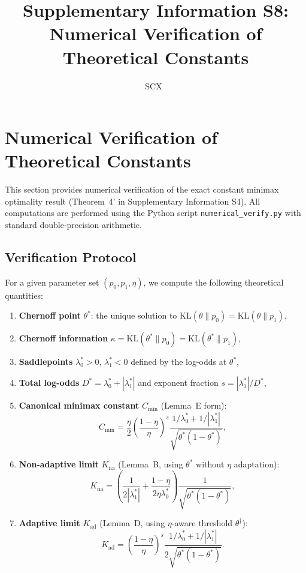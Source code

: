 \documentclass[article]{amsart}
\title{Supplementary Information S8: Numerical Verification of Theoretical Constants}
\author{SCX\ }
\theoremstyle{definition}
\begin{document}
\maketitle

\section{Numerical Verification of Theoretical Constants}

This section provides numerical verification of the exact constant minimax optimality result (Theorem~4' in Supplementary Information S4). All computations are performed using the Python script \texttt{numerical\_verify.py} with standard double-precision arithmetic.

\subsection{Verification Protocol}

For a given parameter set $(p_0, p_1, \eta)$, we compute the following theoretical quantities:

\begin{enumerate}
    \item \textbf{Chernoff point} $\theta^*$: the unique solution to $\mathrm{KL}(\theta\|p_0) = \mathrm{KL}(\theta\|p_1)$,
    \item \textbf{Chernoff information} $\kappa = \mathrm{KL}(\theta^*\|p_0) = \mathrm{KL}(\theta^*\|p_1)$,
    \item \textbf{Saddlepoints} $\lambda_0^* > 0$, $\lambda_1^* < 0$ defined by the log-odds at $\theta^*$,
    \item \textbf{Total log-odds} $D^* = \lambda_0^* + |\lambda_1^*|$ and exponent fraction $s = |\lambda_1^*|/D^*$,
    \item \textbf{Canonical minimax constant} $C_{\min}$ (Lemma~E form):
        \begin{equation}
        C_{\min} = \frac{\eta}{2} \left(\frac{1-\eta}{\eta}\right)^{s}
        \frac{1/\lambda_0^* + 1/|\lambda_1^*|}{\sqrt{\theta^*(1-\theta^*)}},
        \end{equation}
    \item \textbf{Non-adaptive limit} $K_{\mathrm{na}}$ (Lemma~B, using $\theta^*$ without $\eta$ adaptation):
        \begin{equation}
        K_{\mathrm{na}} = \left(\frac{1}{2|\lambda_1^*|} + \frac{1-\eta}{2\eta\lambda_0^*}\right) \frac{1}{\sqrt{\theta^*(1-\theta^*)}},
        \end{equation}
    \item \textbf{Adaptive limit} $K_{\mathrm{ad}}$ (Lemma~D, using $\eta$-aware threshold $\theta^\dagger$):
        \begin{equation}
        K_{\mathrm{ad}} = \left(\frac{1-\eta}{\eta}\right)^{s} \frac{1/\lambda_0^* + 1/|\lambda_1^*|}{2\sqrt{\theta^*(1-\theta^*)}}.
        \end{equation}
\end{enumerate}
\end{document}
